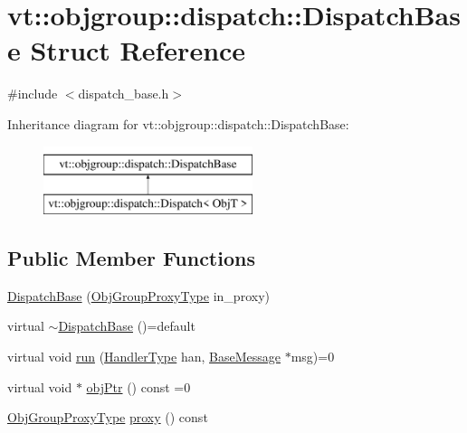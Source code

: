 \hypertarget{structvt_1_1objgroup_1_1dispatch_1_1_dispatch_base}{}\section{vt\+:\+:objgroup\+:\+:dispatch\+:\+:Dispatch\+Base Struct Reference}
\label{structvt_1_1objgroup_1_1dispatch_1_1_dispatch_base}


{\ttfamily \#include $<$dispatch\+\_\+base.\+h$>$}

Inheritance diagram for vt\+:\+:objgroup\+:\+:dispatch\+:\+:Dispatch\+Base\+:\begin{figure}[H]
\begin{center}
\leavevmode
\includegraphics[height=2.000000cm]{structvt_1_1objgroup_1_1dispatch_1_1_dispatch_base}
\end{center}
\end{figure}
\subsection*{Public Member Functions}
\begin{DoxyCompactItemize}
\item 
\hyperlink{structvt_1_1objgroup_1_1dispatch_1_1_dispatch_base_ac6d83a669d4b1a30fbdc264de4d5bcb4}{Dispatch\+Base} (\hyperlink{namespacevt_ad7cae989df485fccca57f0792a880a8e}{Obj\+Group\+Proxy\+Type} in\+\_\+proxy)
\item 
virtual \hyperlink{structvt_1_1objgroup_1_1dispatch_1_1_dispatch_base_ad3a30bcc1ed4d045c208818d10b6cf96}{$\sim$\+Dispatch\+Base} ()=default
\item 
virtual void \hyperlink{structvt_1_1objgroup_1_1dispatch_1_1_dispatch_base_a539a57642138f35e38419e57e9138a2f}{run} (\hyperlink{namespacevt_af64846b57dfcaf104da3ef6967917573}{Handler\+Type} han, \hyperlink{namespacevt_ac34f95a5e2b8109b55bfba52b074443d}{Base\+Message} $\ast$msg)=0
\item 
virtual void $\ast$ \hyperlink{structvt_1_1objgroup_1_1dispatch_1_1_dispatch_base_ad0ba1baf3de179f6d6b749aedcd76490}{obj\+Ptr} () const =0
\item 
\hyperlink{namespacevt_ad7cae989df485fccca57f0792a880a8e}{Obj\+Group\+Proxy\+Type} \hyperlink{structvt_1_1objgroup_1_1dispatch_1_1_dispatch_base_a2ab9479966f207847a271999a510f53d}{proxy} () const
\end{DoxyCompactItemize}
